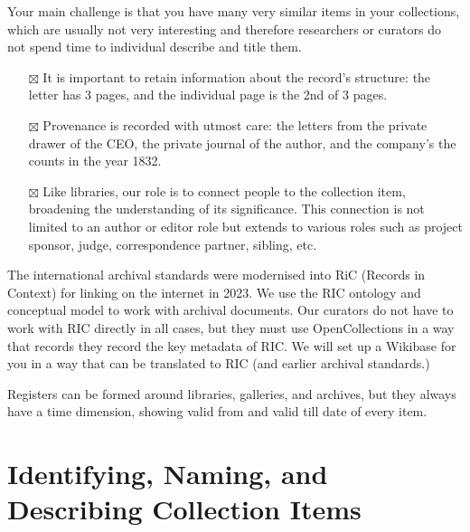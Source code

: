 \documentclass[
  letterpaper,
  DIV=11,
  numbers=noendperiod]{scrreprt}
\providecommand{\tightlist}{%
  \setlength{\itemsep}{0pt}\setlength{\parskip}{0pt}}\usepackage{longtable,booktabs,array}
\begin{document}
\begin{tcolorbox}[enhanced jigsaw, opacityback=0, bottomrule=.15mm, rightrule=.15mm, toptitle=1mm, breakable, colbacktitle=quarto-callout-tip-color!10!white, colback=white, title=\textcolor{quarto-callout-tip-color}{\faLightbulb}\hspace{0.5em}{From business records to archives}, leftrule=.75mm, toprule=.15mm, left=2mm, arc=.35mm, colframe=quarto-callout-tip-color-frame, coltitle=black, titlerule=0mm, bottomtitle=1mm, opacitybacktitle=0.6]

Your main challenge is that you have many very similar items in your
collections, which are usually not very interesting and therefore
researchers or curators do not spend time to individual describe and
title them.

\begin{itemize}
\tightlist
\item[$\boxtimes$]
  It is important to retain information about the record's structure:
  the letter has 3 pages, and the individual page is the 2nd of 3 pages.
\item[$\boxtimes$]
  Provenance is recorded with utmost care: the letters from the private
  drawer of the CEO, the private journal of the author, and the
  company's the counts in the year 1832.
\item[$\boxtimes$]
  Like libraries, our role is to connect people to the collection item,
  broadening the understanding of its significance. This connection is
  not limited to an author or editor role but extends to various roles
  such as project sponsor, judge, correspondence partner, sibling, etc.
\end{itemize}

The international archival standards were modernised into RiC (Records
in Context) for linking on the internet in 2023. We use the RIC ontology
and conceptual model to work with archival documents. Our curators do
not have to work with RIC directly in all cases, but they must use
OpenCollections in a way that records they record the key metadata of
RIC. We will set up a Wikibase for you in a way that can be translated
to RIC (and earlier archival standards.)

\end{tcolorbox}

Registers can be formed around libraries, galleries, and archives, but
they always have a time dimension, showing valid from and valid till
date of every item.

\section{Identifying, Naming, and Describing Collection
Items}\label{identifying-naming-and-describing-collection-items}
\end{document}
